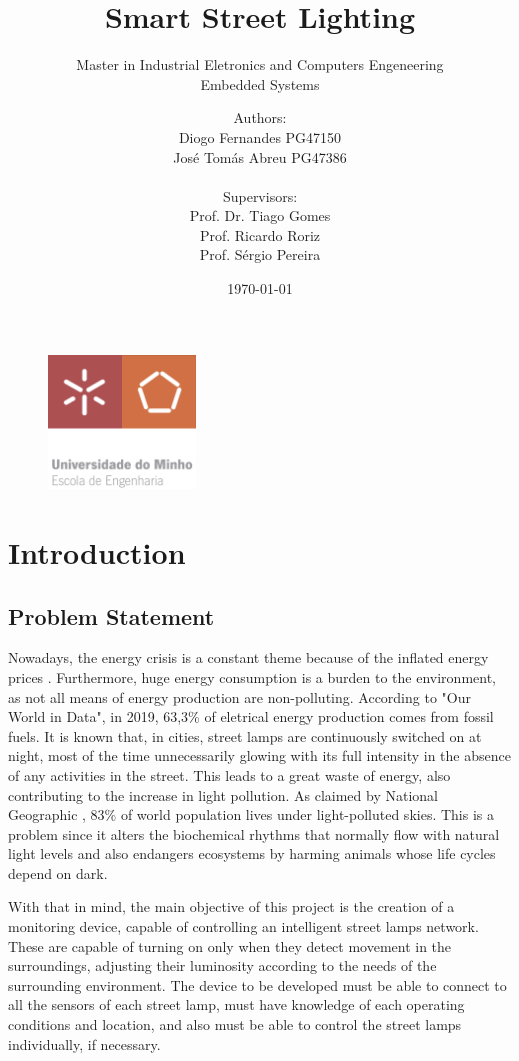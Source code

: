 \documentclass[12pt, letterpaper]{report}
\title{\textbf{Smart Street Lighting}}
\subtitle{{\large Master in Industrial Eletronics and Computers Engeneering} \\ {\large Embedded Systems}}
\author{Authors:\\Diogo Fernandes PG47150\\José Tomás Abreu PG47386\\ \\ Supervisors:\\Prof. Dr. Tiago Gomes\\Prof. Ricardo Roriz\\Prof. Sérgio Pereira}
\date{\today}
\begin{document}
{\begin{figure}[t]
	\centering
	\includegraphics[width=0.35\textwidth]{EEUMLOGO}
\end{figure}}

\maketitle
\clearpage

\tableofcontents
\clearpage

\listoffigures
\clearpage

\listoftables
\clearpage

\chapter{Introduction}
\section{Problem Statement}
Nowadays, the energy crisis is a constant theme because of the inflated energy prices \cite{energy_crisis}. Furthermore, huge energy consumption is a burden to the environment, as not all means of energy production are non-polluting. According to "Our World in Data"\cite{owidenergy}, in 2019, 63,3\% of eletrical energy production comes from fossil fuels. It is known that, in cities, street lamps are continuously switched on at night, most of the time unnecessarily glowing with its full intensity in the absence of any activities in the street.  This leads to a great waste of energy, also contributing to the increase in light pollution. As claimed by National Geographic \cite{light_pollution}, 83\% of world population lives under light-polluted skies. This is a problem since it alters the biochemical rhythms that normally flow with natural light levels and also endangers ecosystems by harming animals whose life cycles depend on dark.

With that in mind, the main objective of this project is the creation of a monitoring device, capable of controlling an intelligent street lamps network. These are capable of turning on only when they detect movement in the surroundings, adjusting their luminosity according to the needs of the surrounding environment. The device to be developed must be able to connect to all the sensors of each street lamp, must have knowledge of each operating conditions and location, and also must be able to control the street lamps individually, if necessary.
\end{document}
